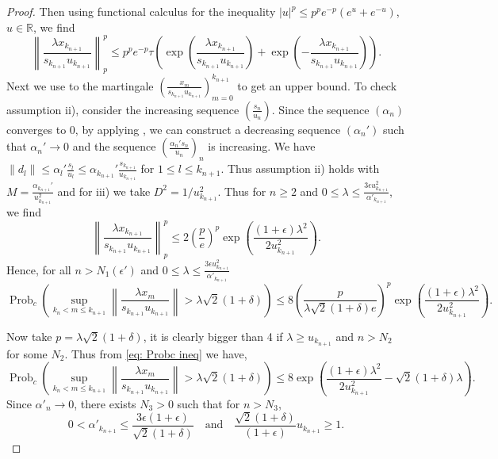 \documentclass[10pt]{amsart}
\theoremstyle{definition}
\theoremstyle{myremark}
\numberwithin{equation}{section}
\def\R{\mathbb R}
\begin{document}
\begin{proof}
    Then using functional calculus for the inequality $|u|^p \le p^p e^{-p} (e^u + e^{-u})$, $u \in \R$, we find $$
    \left\| \frac{\lambda x_{k_{n+1}}}{s_{k_{n+1}} u_{k_{n+1}}} \right\|^p_p
    \le p^p e^{-p} \tau\left( \exp\left( \frac{\lambda x_{k_{n+1}}}{s_{k_{n+1}} u_{k_{n+1}}} \right) + \exp\left( -\frac{\lambda x_{k_{n+1}}}{s_{k_{n+1}} u_{k_{n+1}}} \right) \right).
    $$
Next we use  to the martingale $\left( \frac
{x_ m}{s_{k_{n+1}} u_{k_{n+1}}}\right)_{m=0}^{k_{n+1}}$ to get an upper bound. To check assumption ii), consider the increasing sequence  $\left( \frac{s_n}{u_n} \right).$ Since the sequence $(\alpha_n)$ converges to $0$, by applying , we can construct a decreasing sequence $(\alpha_n')$ such that  $\alpha_n' \to 0$
    and the sequence  
    $\left( \frac{\alpha_n' s_n}{u_n} \right)_n$ 
    is increasing. We have
    $\|d_l\|\leq \alpha_l'\frac {s_l}{u_l}\leq \alpha_{k_{n+1}}'\frac {s_{k_{n+1}}}{u_{k_{n+1}}}$ for $1\leq l\leq k_{n+1}$.
    Thus assumption ii) holds with $M=\frac{\alpha_{k_{n+1}}'}{u_{k_{n+1}}^2}$ and for iii) we take $D^2 = 1/u^2_{k_{n+1}}$. Thus for  $n \ge 2$ and $0 \le \lambda \le \frac{3\epsilon u_{k_{n+1}}^2}{\alpha'_{k_{n+1}}} $, we find
    \begin{equation}\label{alpha1}
    \left\| \frac{\lambda x_{k_{n+1}}}{s_{k_{n+1}} u_{k_{n+1}}} \right\|^p_p
    \le 2 \left( \frac{p}{e} \right)^p \exp\left( \frac{(1 + \epsilon)\lambda^2}{2u^2_{k_{n+1}}} \right).\end{equation}
    Hence, for all $n > N_1(\epsilon') $ and $0 \le \lambda \le \frac{3\epsilon u_{k_{n+1}}^2}{\alpha'_{k_{n+1}}} $
    \begin{equation}\label{eq: Probc ineq}
        \operatorname{Prob}_c\left( \sup_{k_n < m \le k_{n+1}} \left\| \frac{\lambda x_m}{s_{k_{n+1}} u_{k_{n+1}}} \right\| > \lambda \sqrt2(1 + \delta) \right)
        \le 8 \left( \frac{p}{\lambda \sqrt2(1 + \delta) e} \right)^p \exp\left( \frac{(1 + \epsilon)\lambda^2}{2u^2_{k_{n+1}}} \right).
    \end{equation}
    
    Now take $p = \lambda \sqrt2(1 + \delta)$, it is clearly bigger than 4 if $\lambda\geq u_{k_{n+1}}$ and $n>N_2$ for some $N_2$. Thus from \cref{eq: Probc ineq} we have,
    $$
    \operatorname{Prob}_c\left( \sup_{k_n < m \le k_{n+1}} \left\| \frac{\lambda x_m}{s_{k_{n+1}} u_{k_{n+1}}} \right\| > \lambda \sqrt2(1 + \delta) \right)
    \le 8 \exp\left( \frac{(1 + \epsilon)\lambda^2}{2u^2_{k_{n+1}}} - \sqrt2(1 + \delta) \lambda \right).
    $$
    Since $\alpha'_n \to 0$, there exists $N_3 > 0$ such that for $n > N_3$,
    \begin{equation}\label{alpha2}
      0 < \alpha'_{k_{n+1}} \le \frac{3\epsilon (1+\epsilon) }{\sqrt2(1+\delta)} \quad \textrm{and}\quad \frac{\sqrt{2}(1+\delta)}{(1+\epsilon)}u_{k_{n+1}}\geq 1.
    \end{equation}
    

\end{proof}
\end{document}
